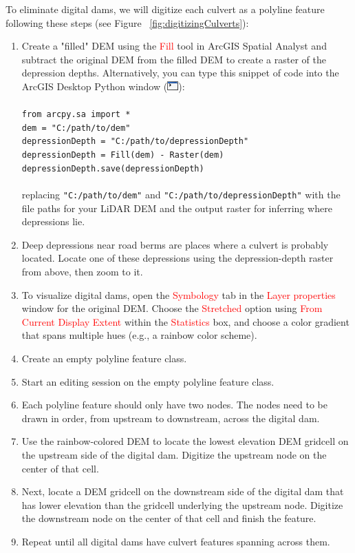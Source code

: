 \documentclass{article}
\newcommand{\toolPar}[1]{\textcolor{red}{#1}}
\begin{document}
		To eliminate digital dams, we will digitize each culvert as a polyline feature following these steps (see Figure ~\ref{fig:digitizingCulverts}):
		\begin{enumerate}
			\item Create a "filled" DEM using the \toolPar{Fill} tool in ArcGIS Spatial Analyst and subtract the original DEM from the filled DEM to create a raster of the depression depths. Alternatively, you can type this snippet of code into the ArcGIS Desktop Python window (\includegraphics[scale=0.8,natwidth=16,natheight=13]{pythonIcon.png}):\\\\
			\texttt{from arcpy.sa import *}\\
			\texttt{dem = "C:/path/to/dem"}\\
			\texttt{depressionDepth = "C:/path/to/depressionDepth"}\\
			\texttt{depressionDepth = Fill(dem) - Raster(dem)}\\
			\texttt{depressionDepth.save(depressionDepth)}\\\\
			replacing \texttt{"C:/path/to/dem"} and \texttt{"C:/path/to/depressionDepth"} with the file paths for your LiDAR DEM and the output raster for inferring where depressions lie.
			\item Deep depressions near road berms are places where a culvert is probably located. Locate one of these depressions using the depression-depth raster from above, then zoom to it.
			\item To visualize digital dams, open the \toolPar{Symbology} tab in the \toolPar{Layer properties} window for the original DEM. Choose the \toolPar{Stretched} option using \toolPar{From Current Display Extent} within the \toolPar{Statistics} box, and choose a color gradient that spans multiple hues (e.g., a rainbow color scheme).
			\item Create an empty polyline feature class.
			\item Start an editing session on the empty polyline feature class.
			\item Each polyline feature should only have two nodes. The nodes need to be drawn in order, from upstream to downstream, across the digital dam. 
			\item Use the rainbow-colored DEM to locate the lowest elevation DEM gridcell on the upstream side of the digital dam. Digitize the upstream node on the center of that cell.
			\item Next, locate a DEM gridcell on the downstream side of the digital dam that has lower elevation than the gridcell underlying the upstream node. Digitize the downstream node on the center of that cell and finish the feature.
			\item Repeat until all digital dams have culvert features spanning across them.
		\end{enumerate}
\end{document}
